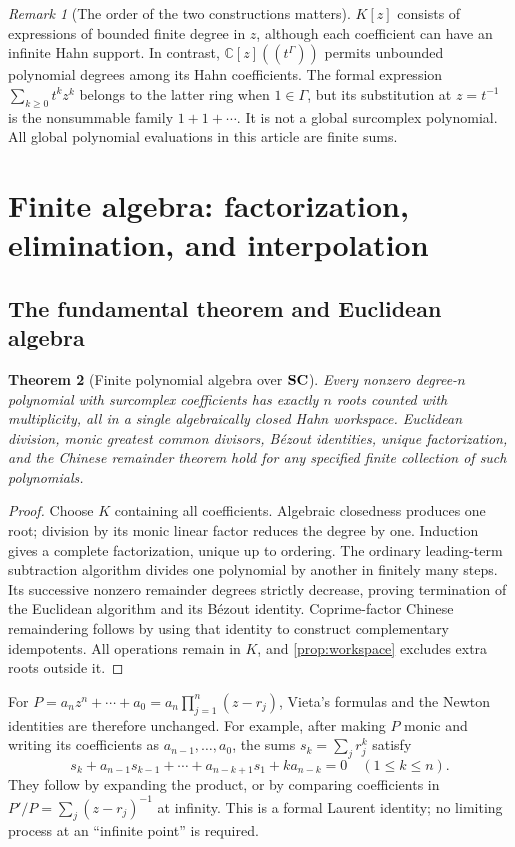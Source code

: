 \documentclass[11pt,letterpaper,oneside]{article}
\numberwithin{equation}{section}
\newtheorem{theorem}{Theorem}[section]
\theoremstyle{definition}
\theoremstyle{remark}\newtheorem{remark}[theorem]{Remark}
\newcommand{\C}{\mathbb C}\newcommand{\R}{\mathbb R}\newcommand{\Q}{\mathbb Q}
\begin{document}
\begin{remark}[The order of the two constructions matters]\label{rem:degree}
$K[z]$ consists of expressions of bounded finite degree in $z$, although
each coefficient can have an infinite Hahn support. In contrast,
$\C[z]((t^\Gamma))$ permits unbounded polynomial degrees among its Hahn
coefficients. The formal expression $\sum_{k\geq0}t^kz^k$ belongs to the
latter ring when $1\in\Gamma$, but its substitution at $z=t^{-1}$ is the
nonsummable family $1+1+\cdots$. It is not a global surcomplex polynomial.
All global polynomial evaluations in this article are finite sums.
\end{remark}

\section{Finite algebra: factorization, elimination, and interpolation}\label{sec:algebra}
\subsection{The fundamental theorem and Euclidean algebra}
\begin{theorem}[Finite polynomial algebra over $\mathbf{SC}$]\label{thm:fta}
Every nonzero degree-$n$ polynomial with surcomplex coefficients has exactly $n$
roots counted with multiplicity, all in a single algebraically closed Hahn
workspace. Euclidean division, monic greatest common divisors, B\'ezout
identities, unique factorization, and the Chinese remainder theorem hold
for any specified finite collection of such polynomials.
\end{theorem}
\begin{proof}
Choose $K$ containing all coefficients. Algebraic closedness produces one
root; division by its monic linear factor reduces the degree by one.
Induction gives a complete factorization, unique up to ordering.
The ordinary leading-term subtraction algorithm divides one polynomial by
another in finitely many steps. Its successive nonzero remainder degrees
strictly decrease, proving termination of the Euclidean algorithm and
its B\'ezout identity. Coprime-factor Chinese remaindering follows by using
that identity to construct complementary idempotents. All operations
remain in $K$, and \cref{prop:workspace} excludes extra roots outside it.
\end{proof}

For $P=a_nz^n+\cdots+a_0=a_n\prod_{j=1}^n(z-r_j)$, Vieta's formulas
and the Newton identities are therefore unchanged. For example, after
making $P$ monic and writing its coefficients as $a_{n-1},\ldots,a_0$,
the sums $s_k=\sum_jr_j^k$ satisfy
\[
 s_k+a_{n-1}s_{k-1}+\cdots+a_{n-k+1}s_1+k a_{n-k}=0
 \quad(1\leq k\leq n).
\]
They follow by expanding the product, or by comparing coefficients in
$P'/P=\sum_j(z-r_j)^{-1}$ at infinity. This is a formal Laurent identity;
no limiting process at an ``infinite point'' is required.
\end{document}
